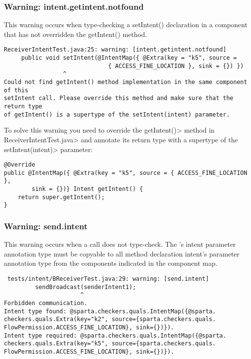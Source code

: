 \subsubsection{Warning: intent.getintent.notfound}
This warning occurs when type-checking a setIntent() declaration in a component
that has not overridden the getIntent() method.

\begin{Verbatim}
ReceiverIntentTest.java:25: warning: [intent.getintent.notfound] 
     public void setIntent(@IntentMap({ @Extra(key = "k5", source = 
                              { ACCESS_FINE_LOCATION }, sink = {}) }) 
                 ^
Could not find getIntent() method implementation in the same component of this
setIntent call. Please override this method and make sure that the return type
of getIntent() is a supertype of the setIntent(intent) parameter.
\end{Verbatim}

To solve this warning you need to override the \<getIntent()> method in 
\<ReceiverIntentTest.java> and annotate its return type with a supertype of the
\<setIntent(intent)> parameter:

\begin{Verbatim}
@Override
public @IntentMap({ @Extra(key = "k5", source = { ACCESS_FINE_LOCATION },
        sink = {})} Intent getIntent() {
    return super.getIntent();
}
\end{Verbatim}

\subsubsection{Warning: send.intent}
This warning occurs when a \sendIntent{} call does not type-check. The
\sendIntent{}'s intent parameter annotation type must be copyable to all
\onReceive{} method declaration intent's parameter annotation type from the
components indicated in the component map.

\begin{Verbatim}
 tests/intent/BReceiverTest.java:29: warning: [send.intent] 
         sendBroadcast(senderIntent1);
                      ^
Forbidden communication. 
Intent type found: @sparta.checkers.quals.IntentMap({@sparta.
checkers.quals.Extra(key="k2", source={sparta.checkers.quals.
FlowPermission.ACCESS_FINE_LOCATION}, sink={})}). 
Intent type required: @sparta.checkers.quals.IntentMap({@sparta.
checkers.quals.Extra(key="k5", source={sparta.checkers.quals.
FlowPermission.ACCESS_FINE_LOCATION}, sink={})}).
\end{Verbatim}

